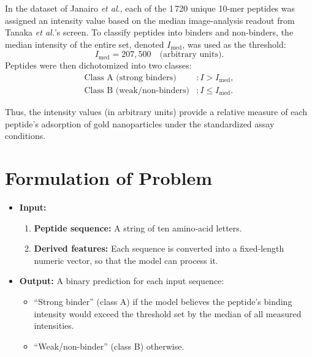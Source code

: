 \documentclass{article}
\begin{document}
In the dataset of Janairo \emph{et al.}, each of the 1\,720 unique 10‐mer peptides was assigned an intensity value based on the median image‐analysis readout from Tanaka \emph{et al.}'s screen. To classify peptides into binders and non‐binders, the median intensity of the entire set, denoted \(I_{\mathrm{med}}\), was used as the threshold:
\[
I_{\mathrm{med}} = 207{,}500 \quad\text{(arbitrary units)}.
\]
Peptides were then dichotomized into two classes:
\begin{align*}
\text{Class A (strong binders)} &: I > I_{\mathrm{med}}, \\
\text{Class B (weak/non‐binders)} &: I \le I_{\mathrm{med}}.
\end{align*}

Thus, the intensity values (in arbitrary units) provide a relative measure of each peptide’s adsorption of gold nanoparticles under the standardized assay conditions.


\section{Formulation of Problem}
\begin{itemize}
    \item \textbf{Input:}\begin{enumerate}
        \item \textbf{Peptide sequence:} A string of ten amino‐acid letters.

        \item \textbf{Derived features:} Each sequence is converted into a fixed-length numeric vector, so that the model can process it.
    \end{enumerate}

    \item \textbf{Output:} A binary prediction for each input sequence:
    \begin{itemize}
        \item “Strong binder” (class A) if the model believes the peptide’s binding intensity would exceed the threshold set by the median of all measured intensities.
        \item “Weak/non-binder” (class B) otherwise.
    \end{itemize}
\end{itemize}
\end{document}
